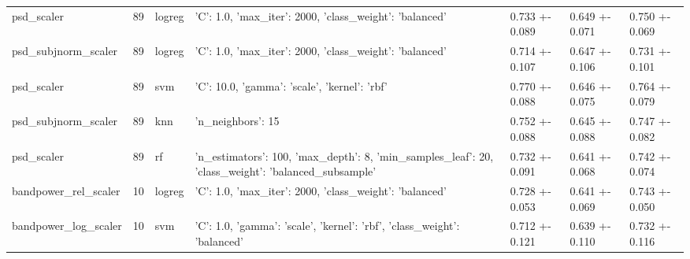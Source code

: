 \begin{tabular}{lrlllll}
psd_scaler & 89 & logreg & {'C': 1.0, 'max_iter': 2000, 'class_weight': 'balanced'} & 0.733 +- 0.089 & 0.649 +- 0.071 & 0.750 +- 0.069 \\
psd_subjnorm_scaler & 89 & logreg & {'C': 1.0, 'max_iter': 2000, 'class_weight': 'balanced'} & 0.714 +- 0.107 & 0.647 +- 0.106 & 0.731 +- 0.101 \\
psd_scaler & 89 & svm & {'C': 10.0, 'gamma': 'scale', 'kernel': 'rbf'} & 0.770 +- 0.088 & 0.646 +- 0.075 & 0.764 +- 0.079 \\
psd_subjnorm_scaler & 89 & knn & {'n_neighbors': 15} & 0.752 +- 0.088 & 0.645 +- 0.088 & 0.747 +- 0.082 \\
psd_scaler & 89 & rf & {'n_estimators': 100, 'max_depth': 8, 'min_samples_leaf': 20, 'class_weight': 'balanced_subsample'} & 0.732 +- 0.091 & 0.641 +- 0.068 & 0.742 +- 0.074 \\
bandpower_rel_scaler & 10 & logreg & {'C': 1.0, 'max_iter': 2000, 'class_weight': 'balanced'} & 0.728 +- 0.053 & 0.641 +- 0.069 & 0.743 +- 0.050 \\
bandpower_log_scaler & 10 & svm & {'C': 1.0, 'gamma': 'scale', 'kernel': 'rbf', 'class_weight': 'balanced'} & 0.712 +- 0.121 & 0.639 +- 0.110 & 0.732 +- 0.116 \\
\bottomrule
\end{tabular}
